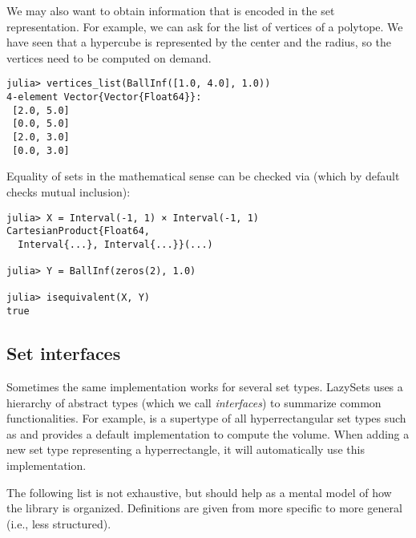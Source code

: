 \smallskip

We may also want to obtain information that is encoded in the set representation.
For example, we can ask for the list of vertices of a polytope.
We have seen that a hypercube is represented by the center and the radius, so the vertices need to be computed on demand.

\begin{minipage}{\linewidth}
\vspace{-\abovedisplayskip}
\begin{lstlisting}
julia> vertices_list(BallInf([1.0, 4.0], 1.0))
4-element Vector{Vector{Float64}}:
 [2.0, 5.0]
 [0.0, 5.0]
 [2.0, 3.0]
 [0.0, 3.0]
\end{lstlisting}
\end{minipage}

Equality of sets in the mathematical sense can be checked via  (which by default checks mutual inclusion):

\begin{minipage}{\linewidth}
\vspace{-\abovedisplayskip}
\begin{lstlisting}
julia> X = Interval(-1, 1) × Interval(-1, 1)
CartesianProduct{Float64,
  Interval{...}, Interval{...}}(...)

julia> Y = BallInf(zeros(2), 1.0)

julia> isequivalent(X, Y)
true
\end{lstlisting}
\end{minipage}


\subsection{Set interfaces}

Sometimes the same implementation works for several set types.
LazySets uses a hierarchy of abstract types (which we call \emph{interfaces}) to summarize common functionalities.
For example,  is a supertype of all hyperrectangular set types such as  and provides a default implementation to compute the volume.
When adding a new set type representing a hyperrectangle, it will automatically use this implementation.

The following list is not exhaustive, but should help as a mental model of how the library is organized. Definitions are given from more specific to more general (i.e., less structured).

\smallskip

